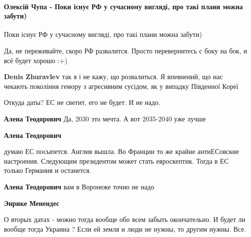 
 
 
 
 
\paragraph{Олексій Чупа - Поки існує РФ у сучасному вигляді, про такі плани можна забути)}
\label{sec:11_01_2022.fb.menendes_enrike.1.ukraina_2030.cmt.oleksij_chupa.plany_zabyt}

\begin{itemize} %
Поки існує РФ у сучасному вигляді, про такі плани можна забути)

\begin{itemize} %
Да, не переживайте, скоро РФ развалится. Просто перевернитесь с боку на бок, и всё будет хорошо :+)

\textbf{Denis Zhuravlev} так я і не кажу, що розвалиться. Я впевнений, що нас чекають покоління гемору з агресивним сусідом, як у випадку Південної Кореї
\end{itemize} %

Откуда даты? ЕС не светит, его не будет. И не надо.

\begin{itemize} %
\textbf{Алена Теодорович} Да, 2030 это мечта. А вот 2035-2040 уже лучше

\textbf{Алена Теодорович} 

думаю ЕС посыпется. Англия вышла. Во Франции то же крайне антиЕСовские
настроения. Следующим президентом может стать евроскептик. Тогда в ЕС только
Германия и останется.

\textbf{Алена Теодорович} вам в Воронеже точно не надо

\textbf{Энрике Менендес} 

О вторых датах - можно тогда вообще обо всем забыть окончательно. И будет ли
вообще тогда Украина ? Если ей земля и люди не нужны, то другим нужны. Все.

\end{itemize} %


\end{itemize}
